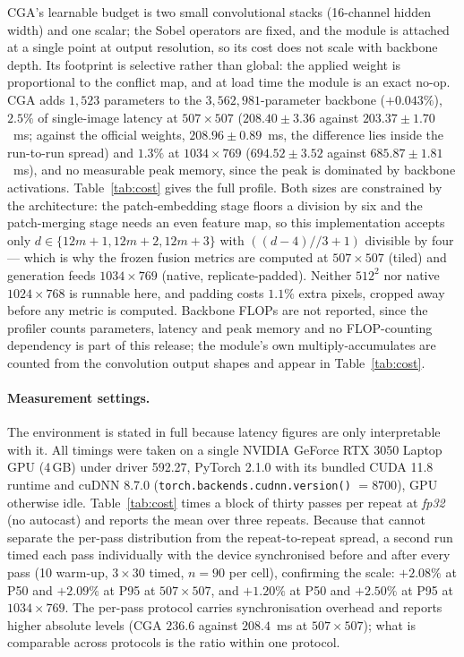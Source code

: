 \documentclass[pdflatex,sn-mathphys-num]{sn-jnl}
\theoremstyle{thmstyleone}%
\theoremstyle{thmstyletwo}%
\theoremstyle{thmstylethree}%
\begin{document}
CGA's learnable budget is two small convolutional stacks (16-channel hidden width) and one scalar; the Sobel operators are fixed, and the module is attached at a single point at output resolution, so its cost does not scale with backbone depth. Its footprint is selective rather than global: the applied weight is proportional to the conflict map, and at load time the module is an exact no-op. CGA adds $1{,}523$ parameters to the $3{,}562{,}981$-parameter backbone ($+0.043\%$), $2.5\%$ of single-image latency at $507\times507$ ($208.40\pm3.36$ against $203.37\pm1.70$~ms; against the official weights, $208.96\pm0.89$~ms, the difference lies inside the run-to-run spread) and $1.3\%$ at $1034\times769$ ($694.52\pm3.52$ against $685.87\pm1.81$~ms), and no measurable peak memory, since the peak is dominated by backbone activations. Table~\ref{tab:cost} gives the full profile. Both sizes are constrained by the architecture: the patch-embedding stage floors a division by six and the patch-merging stage needs an even feature map, so this implementation accepts only $d \in \{12m+1, 12m+2, 12m+3\}$ with $((d-4)//3+1)$ divisible by four --- which is why the frozen fusion metrics are computed at $507\times507$ (tiled) and generation feeds $1034\times769$ (native, replicate-padded). Neither $512^2$ nor native $1024\times768$ is runnable here, and padding costs $1.1\%$ extra pixels, cropped away before any metric is computed. Backbone FLOPs are not reported, since the profiler counts parameters, latency and peak memory and no FLOP-counting dependency is part of this release; the module's own multiply-accumulates are counted from the convolution output shapes and appear in Table~\ref{tab:cost}.

\paragraph{Measurement settings.} The environment is stated in full because latency figures are only interpretable with it. All timings were taken on a single NVIDIA GeForce RTX 3050 Laptop GPU (4\,GB) under driver 592.27, PyTorch 2.1.0 with its bundled CUDA 11.8 runtime and cuDNN 8.7.0 (\texttt{torch.backends.cudnn.version()} $= 8700$), GPU otherwise idle. Table~\ref{tab:cost} times a block of thirty passes per repeat at \emph{fp32} (no autocast) and reports the mean over three repeats. Because that cannot separate the per-pass distribution from the repeat-to-repeat spread, a second run timed each pass individually with the device synchronised before and after every pass (10 warm-up, $3\times30$ timed, $n = 90$ per cell), confirming the scale: $+2.08\%$ at P50 and $+2.09\%$ at P95 at $507\times507$, and $+1.20\%$ at P50 and $+2.50\%$ at P95 at $1034\times769$. The per-pass protocol carries synchronisation overhead and reports higher absolute levels (CGA $236.6$ against $208.4$~ms at $507\times507$); what is comparable across protocols is the ratio within one protocol.
\end{document}
